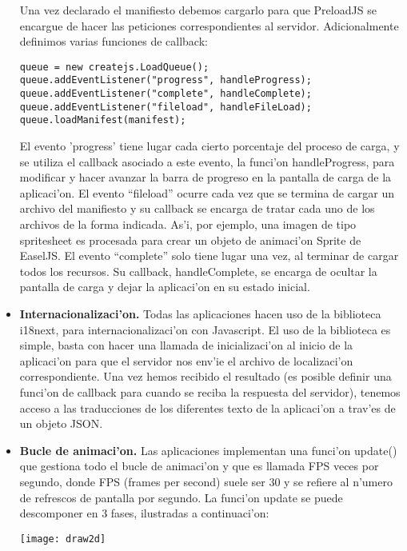 \begin{itemize}
Una vez declarado el manifiesto debemos cargarlo para que PreloadJS se encargue de hacer las peticiones 
correspondientes al servidor. Adicionalmente definimos varias funciones de callback:

\begin{verbatim}
queue = new createjs.LoadQueue();
queue.addEventListener("progress", handleProgress);
queue.addEventListener("complete", handleComplete);
queue.addEventListener("fileload", handleFileLoad);
queue.loadManifest(manifest);
\end{verbatim}

El evento 'progress' tiene lugar cada cierto porcentaje del proceso de carga, y se utiliza el callback asociado a 
este evento, la funci'on handleProgress, para modificar y hacer avanzar la barra de progreso en la pantalla de carga
de la aplicaci'on.
El evento ``fileload'' ocurre cada vez que se termina de cargar un archivo del manifiesto y su callback se encarga de
tratar cada uno de los archivos de la forma indicada. As'i, por ejemplo, una imagen de tipo spritesheet es procesada 
para crear un objeto de animaci'on Sprite de EaselJS.
El evento ``complete'' solo tiene lugar una vez, al terminar de cargar todos los recursos. Su callback, handleComplete,
se encarga de ocultar la pantalla de carga y dejar la aplicaci'on en su estado inicial.
\item \textbf{Internacionalizaci'on.} Todas las aplicaciones hacen uso de la biblioteca i18next, para internacionalizaci'on
con Javascript. El uso de la biblioteca es simple, basta con hacer una llamada de inicializaci'on al inicio de la
aplicaci'on para que el servidor nos env'ie el archivo de localizaci'on correspondiente. Una vez hemos recibido el
resultado (es posible definir una funci'on de callback para cuando se reciba la respuesta del servidor), tenemos 
acceso a las traducciones de los diferentes texto de la aplicaci'on a trav'es de un objeto JSON.
\item \textbf{Bucle de animaci'on.} Las aplicaciones implementan una funci'on update() que gestiona todo el bucle de 
animaci'on y que es llamada FPS veces por segundo, donde FPS (frames per second) suele ser 30 y se refiere al n'umero
de refrescos de pantalla por segundo.
La funci'on update se puede descomponer en 3 fases, ilustradas a continuaci'on:

\begin{center}
\texttt{[image: draw2d]}
\end{center}


\end{itemize}

